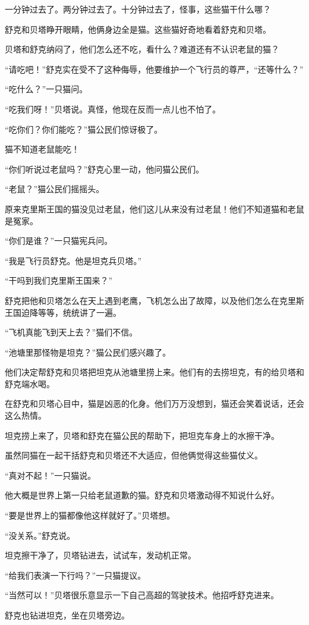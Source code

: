 \documentclass[a4paper,12pt,UTF8,twoside]{ctexbook}
\begin{document}
一分钟过去了。两分钟过去了。十分钟过去了，怪事，这些猫干什么哪？

舒克和贝塔睁开眼睛，他俩身边全是猫。这些猫好奇地看着舒克和贝塔。

贝塔和舒克纳闷了，他们怎么还不吃，看什么？难道还有不认识老鼠的猫？

“请吃吧！”舒克实在受不了这种侮辱，他要维护一个飞行员的尊严，“还等什么？”

“吃什么？”一只猫问。

“吃我们呀！”贝塔说。真怪，他现在反而一点儿也不怕了。

“吃你们？你们能吃？”猫公民们惊讶极了。

猫不知道老鼠能吃！

“你们听说过老鼠吗？”舒克心里一动，他问猫公民们。

“老鼠？”猫公民们摇摇头。

原来克里斯王国的猫没见过老鼠，他们这儿从来没有过老鼠！他们不知道猫和老鼠是冤家。

“你们是谁？”一只猫宪兵问。

“我是飞行员舒克。他是坦克兵贝塔。”

“干吗到我们克里斯王国来？”

舒克把他和贝塔怎么在天上遇到老鹰，飞机怎么出了故障，以及他们怎么在克里斯王国迫降等等，统统讲了一遍。

“飞机真能飞到天上去？”猫们不信。

“池塘里那怪物是坦克？”猫公民们感兴趣了。

他们决定帮舒克和贝塔把坦克从池塘里捞上来。他们有的去捞坦克，有的给贝塔和舒克端水喝。

在舒克和贝塔心目中，猫是凶恶的化身。他们万万没想到，猫还会笑着说话，还会这么热情。

坦克捞上来了，贝塔和舒克在猫公民的帮助下，把坦克车身上的水擦干净。

虽然同猫在一起干括舒克和贝塔还不大适应，但他俩觉得这些猫仗义。

“真对不起！”一只猫说。

他大概是世界上第一只给老鼠道歉的猫。舒克和贝塔激动得不知说什么好。

“要是世界上的猫都像他这样就好了。”贝塔想。

“没关系。”舒克说。

坦克擦干净了，贝塔钻进去，试试车，发动机正常。

“给我们表演一下行吗？”一只猫提议。

“当然可以！”贝塔很乐意显示一下自己高超的驾驶技术。他招呼舒克进来。

舒克也钻进坦克，坐在贝塔旁边。
\end{document}

